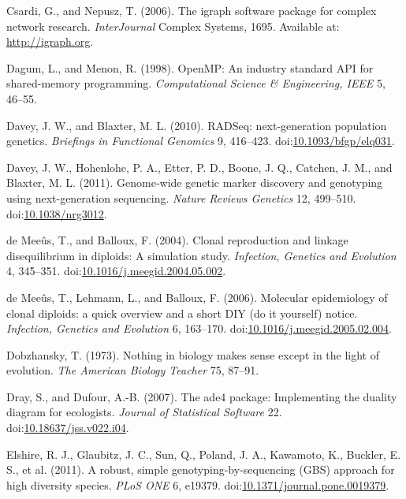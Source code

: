 \documentclass[double,12pt]{beavtex}
\begin{document}
  \hypertarget{ref-csardi2006igraph}{}
  Csardi, G., and Nepusz, T. (2006). The igraph software package for
  complex network research. \emph{InterJournal} Complex Systems, 1695.
  Available at: \url{http://igraph.org}.
  
  \hypertarget{ref-dagum1998openmp}{}
  Dagum, L., and Menon, R. (1998). OpenMP: An industry standard API for
  shared-memory programming. \emph{Computational Science \& Engineering,
  IEEE} 5, 46--55.
  
  \hypertarget{ref-davey2010rad}{}
  Davey, J. W., and Blaxter, M. L. (2010). RADSeq: next-generation
  population genetics. \emph{Briefings in Functional Genomics} 9,
  416--423.
  doi:\href{https://doi.org/10.1093/bfgp/elq031}{10.1093/bfgp/elq031}.
  
  \hypertarget{ref-davey2011genome}{}
  Davey, J. W., Hohenlohe, P. A., Etter, P. D., Boone, J. Q., Catchen, J.
  M., and Blaxter, M. L. (2011). Genome-wide genetic marker discovery and
  genotyping using next-generation sequencing. \emph{Nature Reviews
  Genetics} 12, 499--510.
  doi:\href{https://doi.org/10.1038/nrg3012}{10.1038/nrg3012}.
  
  \hypertarget{ref-de2004clonal}{}
  de Meeûs, T., and Balloux, F. (2004). Clonal reproduction and linkage
  disequilibrium in diploids: A simulation study. \emph{Infection,
  Genetics and Evolution} 4, 345--351.
  doi:\href{https://doi.org/10.1016/j.meegid.2004.05.002}{10.1016/j.meegid.2004.05.002}.
  
  \hypertarget{ref-de2006molecular}{}
  de Meeûs, T., Lehmann, L., and Balloux, F. (2006). Molecular
  epidemiology of clonal diploids: a quick overview and a short DIY (do it
  yourself) notice. \emph{Infection, Genetics and Evolution} 6, 163--170.
  doi:\href{https://doi.org/10.1016/j.meegid.2005.02.004}{10.1016/j.meegid.2005.02.004}.
  
  \hypertarget{ref-dobzhansky2013nothing}{}
  Dobzhansky, T. (1973). Nothing in biology makes sense except in the
  light of evolution. \emph{The American Biology Teacher} 75, 87--91.
  
  \hypertarget{ref-dray2007ade4}{}
  Dray, S., and Dufour, A.-B. (2007). The ade4 package: Implementing the
  duality diagram for ecologists. \emph{Journal of Statistical Software}
  22.
  doi:\href{https://doi.org/10.18637/jss.v022.i04}{10.18637/jss.v022.i04}.
  
  \hypertarget{ref-elshire2011robust}{}
  Elshire, R. J., Glaubitz, J. C., Sun, Q., Poland, J. A., Kawamoto, K.,
  Buckler, E. S., et al. (2011). A robust, simple genotyping-by-sequencing
  (GBS) approach for high diversity species. \emph{PLoS ONE} 6, e19379.
  doi:\href{https://doi.org/10.1371/journal.pone.0019379}{10.1371/journal.pone.0019379}.
  
\end{document}
